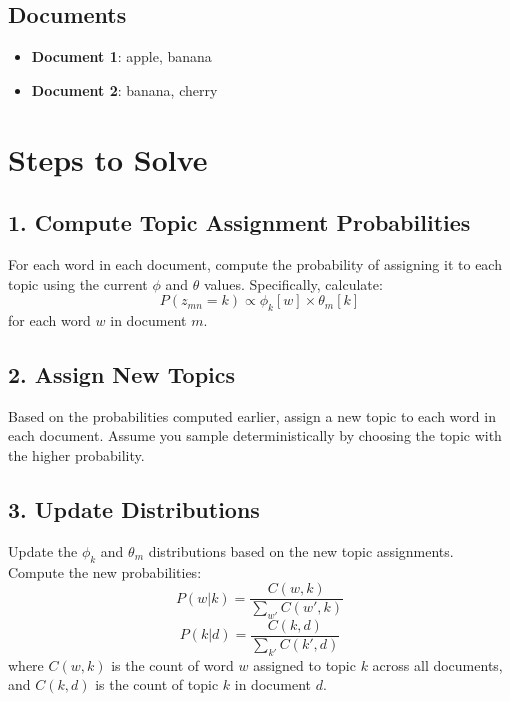 \documentclass{article}
\begin{document}
\subsection*{Documents}
\begin{itemize}
    \item \textbf{Document 1}: apple, banana
    \item \textbf{Document 2}: banana, cherry
\end{itemize}

\section*{Steps to Solve}

\subsection*{1. Compute Topic Assignment Probabilities}
For each word in each document, compute the probability of assigning it to each topic using the current $\phi$ and $\theta$ values. Specifically, calculate:
\[
P(z_{mn} = k) \propto \phi_k[w] \times \theta_m[k]
\]
for each word $w$ in document $m$.

\subsection*{2. Assign New Topics}
Based on the probabilities computed earlier, assign a new topic to each word in each document. Assume you sample deterministically by choosing the topic with the higher probability.

\subsection*{3. Update Distributions}
Update the $\phi_k$ and $\theta_m$ distributions based on the new topic assignments. Compute the new probabilities:
\[
P(w|k) = \frac{C(w, k)}{\sum_{w'} C(w', k)}
\]
\[
P(k|d) = \frac{C(k, d)}{\sum_{k'} C(k', d)}
\]
where $C(w, k)$ is the count of word $w$ assigned to topic $k$ across all documents, and $C(k, d)$ is the count of topic $k$ in document $d$.
\end{document}
